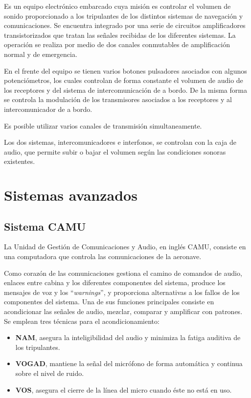 Es un equipo electr\'onico embarcado cuya misi\'on es controlar el volumen de sonido proporcionado a los tripulantes de los distintos sistemas de navegaci\'on y comunicaciones. Se encuentra integrado por una serie de circuitos amplificadores transistorizados que tratan las se\~nales recibidas de los diferentes sistemas. La operaci\'on se realiza por medio de dos canales conmutables de amplificaci\'on normal y de emergencia.

En el frente del equipo se tienen varios botones pulsadores asociados con algunos potenci\'ometros, los cuales controlan de forma constante el volumen de audio de los receptores y del sistema de intercomunicaci\'on de a bordo. 
De la misma forma se controla la modulaci\'on de los transmisores asociados a los receptores y al intercomunicador de a bordo.

Es posible utilizar varios canales de transmisi\'on simultaneamente.

Los dos sistemas, intercomunicadores e interfonos, se controlan con la caja de audio, que permite subir o bajar el volumen seg\'un las condiciones sonoras existentes.

\section{Sistemas avanzados}
\label{sec:09.03.sistemas.avanzados}

\subsection{Sistema CAMU}
\label{sec:09.03.01.CAMU}

La Unidad de Gesti\'on de Comunicaciones y Audio, en ingl\'es \ac{CAMU}, consiste en una computadora que controla las comunicaciones de la aeronave.

Como coraz\'on de las comunicaciones gestiona el camino de comandos de audio, enlaces entre cabina y los diferentes componentes del sistema, produce los mensajes de voz y los ``{\it warnings}'', y proporciona alternativas a los fallos de los componentes del sistema. Una de sus funciones principales consiste en acondicionar las se\~nales de audio, mezclar, comparar y amplificar con patrones. Se emplean tres t\'ecnicas para el acondicionamiento:

\begin{itemize}
\item {\bf \ac{NAM}}, asegura la inteligibilidad del audio y minimiza la fatiga auditiva de los tripulantes.
\item {\bf \ac{VOGAD}}, mantiene la se\~nal del micr\'ofono de forma autom\'atica y continua sobre el nivel de ruido.
\item {\bf \ac{VOS}}, asegura el cierre de la l\'inea del micro cuando \'este no est\'a en uso.
\end{itemize}

